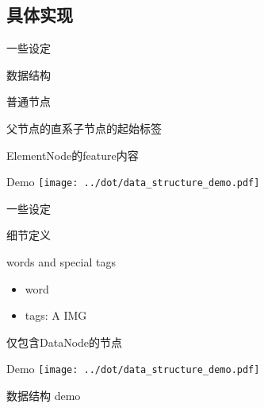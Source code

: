 \documentclass{beamer}
\begin{document}
\subsection{具体实现}
\begin{frame}{一些设定}
    \begin{center}
    \begin{overprint}
        \begin{block}{数据结构}
            \begin{description}
            \item [ElementNode] 普通节点
            \item [StyleNode] 父节点的直系子节点的起始标签
            \item [DataNode] ElementNode的feature内容
            \end{description}
        \end{block}

        \begin{block}{Demo}
            \texttt{[image: ../dot/data\_structure\_demo.pdf]}
        \end{block}
    \end{overprint}
    \end{center}
\end{frame}

\begin{frame}{一些设定}
    \begin{center}
    \begin{overprint}
        \begin{block}{细节定义}
            \begin{description}
            \item [features] words and special tags
                \begin{itemize}
                \item word
                \item tags: A IMG 
                \end{itemize}
            \item [leaf node] 仅包含DataNode的节点
            \end{description}
        \end{block}

        \begin{block}{Demo}
            \texttt{[image: ../dot/data\_structure\_demo.pdf]}
        \end{block}
    \end{overprint}
    \end{center}
\end{frame}
\begin{frame}{数据结构}
   demo 
\end{frame}
\end{document}
